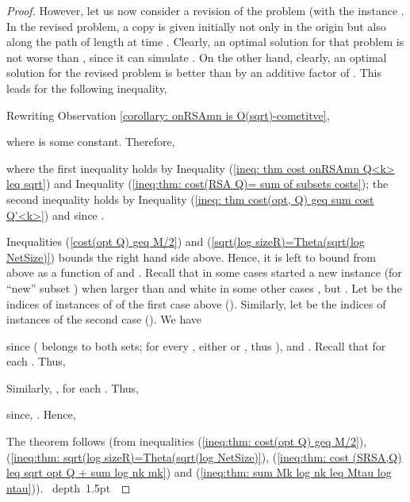 \documentclass[11pt]{article}
\def\blackslug{\hbox{\hskip 1pt \vrule width 4pt height 8pt
    depth 1.5pt \hskip 1pt}}
\def\QED{\quad\blackslug\lower 8.5pt\null\par}
\begin{document}
{\begin{proof}
However, let us now consider a revision of the  problem (with the instance
. In the revised problem, a copy is given initially not only in the origin  but also along the path of length  at time . Clearly, an optimal solution for that problem is not worse than
, since it can simulate
 . On the other
hand, clearly, an optimal solution for the revised problem is better than
 by an additive factor of .
This leads for the following inequality,

Rewriting  Observation \ref{corollary: onRSAmn is O(sqrt)-cometitve},
\commsingle

\commsingleend
\commdouble

\commdoubleend
where  is some constant.
Therefore,
\commsingle

\commsingleend
where the first inequality holds by Inequality (\ref{ineq: thm cost onRSAmn Q<k> leq sqrt}) and Inequality (\ref{ineq:thm: cost(RSA Q)= sum of subsets costs});
the second inequality holds by Inequality (\ref{ineq: thm cost(opt, Q) geq sum cost Q'<k>}) and since .














Inequalities (\ref{cost(opt Q) geq M/2}) and (\ref{sqrt(log sizeR)=Theta(sqrt(log NetSize)})
bounds the right hand side above. Hence,
it is left to bound  from above  as a function of  and .
Recall that in some cases  started a new instance  (for ``new'' subset )
when  larger than  and white in some other cases , but .
Let  be the indices
of instances of  of the first case above ().
Similarly, let 
be the indices of instances of the second case ().
We have
\commsingle

\commsingleend
\commdouble

\commdoubleend
since 
( belongs to both sets; for every , either  or , thus ),
 and .
Recall that  for each .
Thus,

Similarly, , for each .
Thus,

since, .
Hence,

The theorem follows (from inequalities
(\ref{ineq:thm: cost(opt Q) geq M/2}), (\ref{ineq:thm: sqrt(log sizeR)=Theta(sqrt(log NetSize)}),
(\ref{ineq:thm: cost (SRSA,Q) leq sqrt opt Q + sum log nk mk})
and (\ref{ineq:thm: sum Mk log nk leq Mtau log ntau})).
\QED\end{proof}
} 
\end{document}
